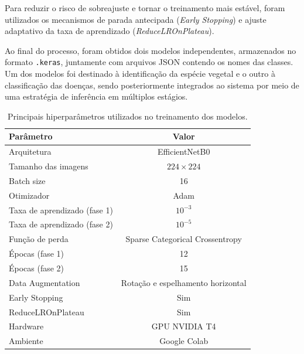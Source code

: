 \documentclass[portuguese]{sbc2025}%
\begin{document}
Para reduzir o risco de sobreajuste e tornar o treinamento mais estável, foram utilizados os mecanismos de parada antecipada 
(\textit{Early Stopping}) e ajuste adaptativo da taxa de aprendizado (\textit{ReduceLROnPlateau}).

Ao final do processo, foram obtidos dois modelos independentes, armazenados no formato \texttt{.keras}, juntamente com arquivos 
JSON contendo os nomes das classes. Um dos modelos foi destinado à identificação da espécie vegetal e o outro à classificação das
doenças, sendo posteriormente integrados ao sistema por meio de uma estratégia de inferência em múltiplos estágios.

\begin{table}[ht]
\centering
\caption{Principais hiperparâmetros utilizados no treinamento dos modelos.}
\renewcommand{\arraystretch}{0.9} 
\setlength{\tabcolsep}{5pt}       
{\small
\begin{tabular}{lc}
\hline
Parâmetro & Valor \\
\hline
Arquitetura & EfficientNetB0 \\
Tamanho das imagens & $224 \times 224$ \\
Batch size & 16 \\
Otimizador & Adam \\
Taxa de aprendizado (fase 1) & $10^{-3}$ \\
Taxa de aprendizado (fase 2) & $10^{-5}$ \\
Função de perda & Sparse Categorical Crossentropy \\
Épocas (fase 1) & 12 \\
Épocas (fase 2) & 15 \\
Data Augmentation & Rotação e espelhamento horizontal \\
Early Stopping & Sim \\
ReduceLROnPlateau & Sim \\
Hardware & GPU NVIDIA T4 \\
Ambiente & Google Colab \\
\hline
\end{tabular}
}
\label{tab:hiperparametros}
\end{table}
\end{document}
